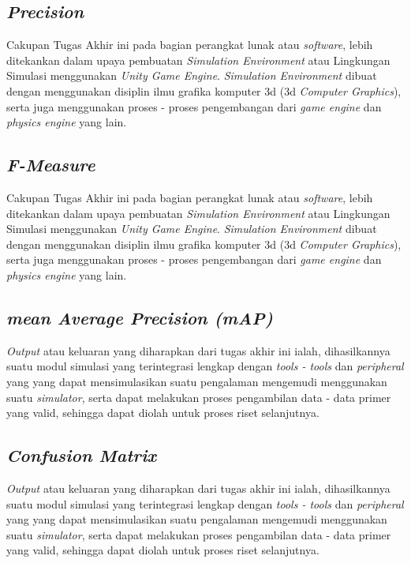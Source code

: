 \subsection{\textit{Precision}}
Cakupan Tugas Akhir ini pada bagian perangkat lunak atau \textit{software}, lebih ditekankan dalam upaya pembuatan \textit{Simulation Environment} atau Lingkungan Simulasi menggunakan \textit{Unity Game Engine}. \textit{Simulation Environment} dibuat dengan menggunakan disiplin ilmu grafika komputer 3d (3d \textit{Computer Graphics}), serta juga menggunakan proses - proses pengembangan dari \textit{game engine} dan \textit{physics engine} yang lain.
\vspace{1ex}

\subsection{\textit{F-Measure}}
Cakupan Tugas Akhir ini pada bagian perangkat lunak atau \textit{software}, lebih ditekankan dalam upaya pembuatan \textit{Simulation Environment} atau Lingkungan Simulasi menggunakan \textit{Unity Game Engine}. \textit{Simulation Environment} dibuat dengan menggunakan disiplin ilmu grafika komputer 3d (3d \textit{Computer Graphics}), serta juga menggunakan proses - proses pengembangan dari \textit{game engine} dan \textit{physics engine} yang lain.
\vspace{1ex}

\subsection{\textit{mean Average Precision (mAP)}}
\textit{Output} atau keluaran yang diharapkan dari tugas akhir ini ialah, dihasilkannya suatu modul simulasi yang terintegrasi lengkap dengan \textit{tools - tools} dan \textit{peripheral} yang yang dapat mensimulasikan suatu pengalaman mengemudi menggunakan suatu \textit{simulator}, serta dapat melakukan proses pengambilan data - data primer yang valid, sehingga dapat diolah untuk proses riset selanjutnya.
\vspace{1ex}

\subsection{\textit{Confusion Matrix}}
\textit{Output} atau keluaran yang diharapkan dari tugas akhir ini ialah, dihasilkannya suatu modul simulasi yang terintegrasi lengkap dengan \textit{tools - tools} dan \textit{peripheral} yang yang dapat mensimulasikan suatu pengalaman mengemudi menggunakan suatu \textit{simulator}, serta dapat melakukan proses pengambilan data - data primer yang valid, sehingga dapat diolah untuk proses riset selanjutnya.
\vspace{1ex}